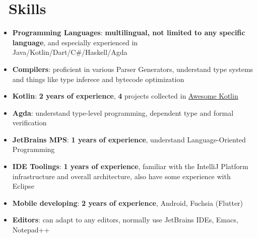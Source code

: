 \documentclass{resume}
\begin{document}
\section{\faCogs\ Skills}
\begin{itemize}[parsep=0.5ex]
  \item \textbf{Programming Languages}:
    \textbf{multilingual, not limited to any specific language},
    and especially experienced in Java/Kotlin/Dart/C\#/Haskell/Agda

  \item \textbf{Compilers}:
    proficient in various Parser Generators, understand type systems and things like type inferece and bytecode optimization

  \item \textbf{Kotlin}:
    \textbf{2 years of experience},
    \textbf{4} projects collected in
    \href{https://kotlin.link/?q=ice} {Awesome Kotlin}

  \item \textbf{Agda}:
    understand type-level programming, dependent type and formal verification

  \item \textbf{JetBrains MPS}:
    \textbf{1 years of experience},
    understand Language-Oriented Programming

  \item \textbf{IDE Toolings}:
    \textbf{1 years of experience},
    familiar with the IntelliJ Platform infrastructure and overall architecture,
    also have some experience with Eclipse

  \item \textbf{Mobile developing}:
    \textbf{2 years of experience},
    Android, Fuchsia (Flutter)

  \item \textbf{Editors}:
    can adapt to any editors, normally use JetBrains IDEs, Emacs, Notepad++
\end{itemize}

\end{document}
